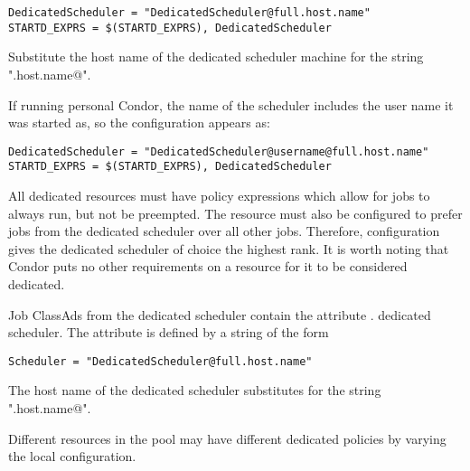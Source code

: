 \begin{verbatim}
DedicatedScheduler = "DedicatedScheduler@full.host.name"
STARTD_EXPRS = $(STARTD_EXPRS), DedicatedScheduler
\end{verbatim}

Substitute the host name of the dedicated scheduler
machine for the string "\verb@full.host.name@". 

If running personal Condor, the name of the scheduler includes
the user name it was started as, so the configuration appears as:

\begin{verbatim}
DedicatedScheduler = "DedicatedScheduler@username@full.host.name"
STARTD_EXPRS = $(STARTD_EXPRS), DedicatedScheduler
\end{verbatim}

All dedicated resources must have policy expressions which allow for
jobs to always run, but not be preempted.
The resource must also be configured to prefer jobs from the dedicated 
scheduler over all other jobs.
Therefore, configuration gives
the dedicated scheduler of choice the highest rank.
It is worth noting that Condor puts no other requirements on a
resource for it to be considered dedicated.  

Job ClassAds from the dedicated scheduler 
contain the attribute .
dedicated scheduler.
The attribute is defined by a string of the form 
\begin{verbatim}
Scheduler = "DedicatedScheduler@full.host.name"
\end{verbatim}
The host name of the dedicated scheduler
substitutes for the string "\verb@full.host.name@". 

Different resources in the pool may have different dedicated policies
by varying the local configuration.

